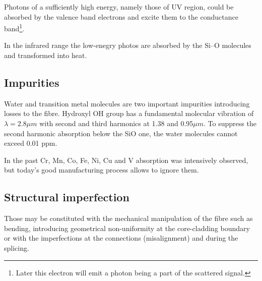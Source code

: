 Photons of a sufficiently high energy, namely those of UV region, could be absorbed by the valence band electrons and excite them to the conductance band\footnote{Later this electron will emit a photon being a part of the scattered signal.}. 

In the infrared range the low-enegry photos are absorbed by the Si--O molecules and transformed into heat.

\subsection{Impurities}

Water and transition metal molecules are two important impurities introducing losses to the fibre. Hydroxyl OH group has a fundamental molecular vibration of $\lambda=2.8\mu m$ with second and third harmonics at 1.38 and 0.95$\mu m$. To suppress the second harmonic absorption below the SiO one, the water molecules cannot exceed 0.01 ppm.

In the past Cr, Mn, Co, Fe, Ni, Cu and V absorption was intensively observed, but today's good manufacturing process allows to ignore them.

\subsection{Structural imperfection}
Those may be constituted with the mechanical manipulation of the fibre such as bending, introducing geometrical  non-uniformity at the core-cladding boundary or with the imperfections at the connections (misalignment) and during the splicing.
